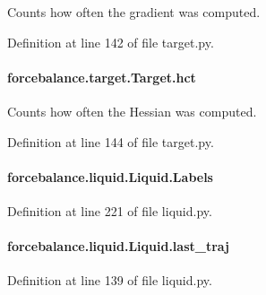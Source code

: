 Counts how often the gradient was computed. 



Definition at line 142 of file target.\-py.

\hypertarget{classforcebalance_1_1target_1_1Target_a5b5a42f78052b47f29ed4b940c6111a1}{
\paragraph[{hct}]{\setlength{\rightskip}{0pt plus 5cm}forcebalance.\-target.\-Target.\-hct\hspace{0.3cm}{\ttfamily [inherited]}}}\label{classforcebalance_1_1target_1_1Target_a5b5a42f78052b47f29ed4b940c6111a1}


Counts how often the Hessian was computed. 



Definition at line 144 of file target.\-py.

\hypertarget{classforcebalance_1_1liquid_1_1Liquid_a50f976d2d3d6a1c261756035a26390e2}{
\paragraph[{Labels}]{\setlength{\rightskip}{0pt plus 5cm}forcebalance.\-liquid.\-Liquid.\-Labels}}\label{classforcebalance_1_1liquid_1_1Liquid_a50f976d2d3d6a1c261756035a26390e2}


Definition at line 221 of file liquid.\-py.

\hypertarget{classforcebalance_1_1liquid_1_1Liquid_a95bb7b38b7638acba286718e55f783bb}{
\paragraph[{last\-\_\-traj}]{\setlength{\rightskip}{0pt plus 5cm}forcebalance.\-liquid.\-Liquid.\-last\-\_\-traj}}\label{classforcebalance_1_1liquid_1_1Liquid_a95bb7b38b7638acba286718e55f783bb}


Definition at line 139 of file liquid.\-py.

